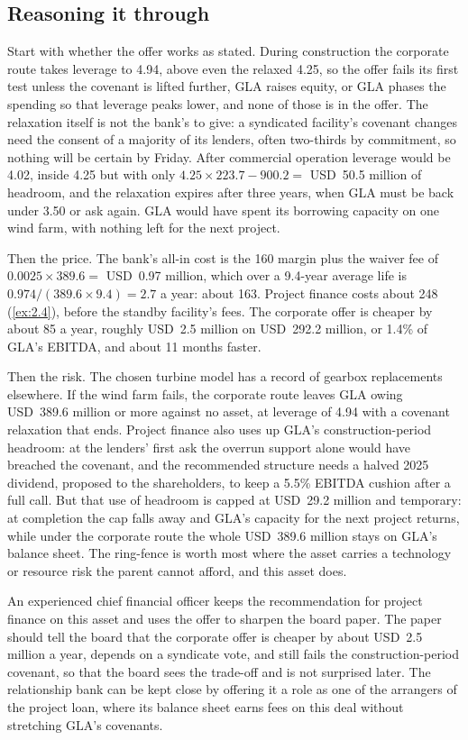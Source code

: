 \subsection*{Reasoning it through}
Start with whether the offer works as stated. During construction the corporate route takes leverage to 4.94\x, above even the relaxed 4.25\x, so the offer fails its first test unless the covenant is lifted further, GLA raises equity, or GLA phases the spending so that leverage peaks lower, and none of those is in the offer. The relaxation itself is not the bank's to give: a syndicated facility's covenant changes need the consent of a majority of its lenders, often two-thirds by commitment, so nothing will be certain by Friday. After commercial operation leverage would be 4.02\x, inside 4.25\x{} but with only $4.25 \times 223.7 - 900.2 = $ USD~50.5 million of headroom, and the relaxation expires after three years, when GLA must be back under 3.50\x{} or ask again. GLA would have spent its borrowing capacity on one wind farm, with nothing left for the next project.

Then the price. The bank's all-in cost is the 160\bps{} margin plus the waiver fee of $0.0025 \times 389.6 = $ USD~0.97 million, which over a 9.4-year average life is $0.974 / (389.6 \times 9.4) = 2.7$\bps{} a year: about 163\bps. Project finance costs about 248\bps{} (\cref{ex:2.4}), before the standby facility's fees. The corporate offer is cheaper by about 85\bps{} a year, roughly USD~2.5 million on USD~292.2 million, or 1.4\% of GLA's EBITDA, and about 11 months faster.

Then the risk. The chosen turbine model has a record of gearbox replacements elsewhere. If the wind farm fails, the corporate route leaves GLA owing USD~389.6 million or more against no asset, at leverage of 4.94\x{} with a covenant relaxation that ends. Project finance also uses up GLA's construction-period headroom: at the lenders' first ask the overrun support alone would have breached the covenant, and the recommended structure needs a halved 2025 dividend, proposed to the shareholders, to keep a 5.5\% EBITDA cushion after a full call. But that use of headroom is capped at USD~29.2 million and temporary: at completion the cap falls away and GLA's capacity for the next project returns, while under the corporate route the whole USD~389.6 million stays on GLA's balance sheet. The ring-fence is worth most where the asset carries a technology or resource risk the parent cannot afford, and this asset does.

An experienced chief financial officer keeps the recommendation for project finance on this asset and uses the offer to sharpen the board paper. The paper should tell the board that the corporate offer is cheaper by about USD~2.5 million a year, depends on a syndicate vote, and still fails the construction-period covenant, so that the board sees the trade-off and is not surprised later. The relationship bank can be kept close by offering it a role as one of the arrangers of the project loan, where its balance sheet earns fees on this deal without stretching GLA's covenants.

